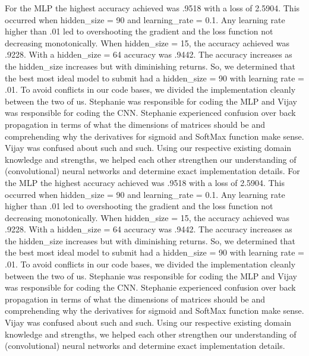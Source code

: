 \documentclass[12pt]{article}
\begin{document}
\begin{flushleft}
For the MLP the highest accuracy achieved was .9518 with a loss of 2.5904. This occurred when hidden\_size = 90 and learning\_rate = 0.1. Any learning rate higher than .01 led to overshooting the gradient and the loss function not decreasing monotonically. When hidden\_size = 15, the accuracy achieved was .9228. With a hidden\_size = 64 accuracy was .9442. The accuracy increases as the hidden\_size increases but with diminishing returns. So, we determined that the best most ideal model to submit had a hidden\_size = 90 with learning rate = .01. To avoid conflicts in our code bases, we divided the implementation cleanly between the two of us. Stephanie was responsible for coding the MLP and Vijay was responsible for coding the CNN. Stephanie experienced confusion over back propagation in terms of what the dimensions of matrices should be and comprehending why the derivatives for sigmoid and SoftMax function make sense. Vijay was confused about such and such. Using our respective existing domain knowledge and strengths, we helped each other strengthen our understanding of (convolutional) neural networks and determine exact implementation details. 
For the MLP the highest accuracy achieved was .9518 with a loss of 2.5904. This occurred when hidden_size = 90 and learning_rate = 0.1. Any learning rate higher than .01 led to overshooting the gradient and the loss function not decreasing monotonically. When hidden_size = 15, the accuracy achieved was .9228. With a hidden_size = 64 accuracy was .9442. The accuracy increases as the hidden_size increases but with diminishing returns. So, we determined that the best most ideal model to submit had a hidden_size = 90 with learning rate = .01. To avoid conflicts in our code bases, we divided the implementation cleanly between the two of us. Stephanie was responsible for coding the MLP and Vijay was responsible for coding the CNN. Stephanie experienced confusion over back propagation in terms of what the dimensions of matrices should be and comprehending why the derivatives for sigmoid and SoftMax function make sense. Vijay was confused about such and such. Using our respective existing domain knowledge and strengths, we helped each other strengthen our understanding of (convolutional) neural networks and determine exact implementation details. 
\end{flushleft}
\end{document}
